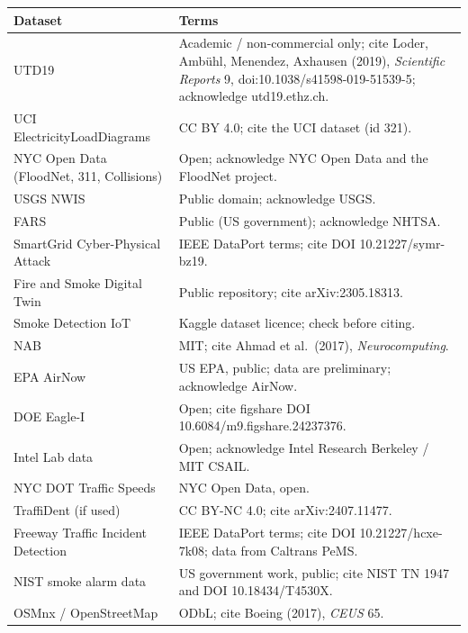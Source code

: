 \documentclass[10pt,a4paper]{article}
\begin{document}
{\small
{}
\begin{tabularx}{\textwidth}{@{}L{4.5cm}Y@{}}
\toprule
\textbf{Dataset} & \textbf{Terms}\\
\midrule
UTD19 & Academic / non-commercial only; cite Loder, Ambühl, Menendez, Axhausen (2019), \textit{Scientific Reports} 9, doi:10.1038/s41598-019-51539-5; acknowledge utd19.ethz.ch.\\
UCI ElectricityLoadDiagrams & CC BY 4.0; cite the UCI dataset (id 321).\\
NYC Open Data (FloodNet, 311, Collisions) & Open; acknowledge NYC Open Data and the FloodNet project.\\
USGS NWIS & Public domain; acknowledge USGS.\\
FARS & Public (US government); acknowledge NHTSA.\\
SmartGrid Cyber-Physical Attack & IEEE DataPort terms; cite DOI 10.21227/symr-bz19.\\
Fire and Smoke Digital Twin & Public repository; cite arXiv:2305.18313.\\
Smoke Detection IoT & Kaggle dataset licence; check before citing.\\
NAB & MIT; cite Ahmad et al.\ (2017), \textit{Neurocomputing}.\\
EPA AirNow & US EPA, public; data are preliminary; acknowledge AirNow.\\
DOE Eagle-I & Open; cite figshare DOI 10.6084/m9.figshare.24237376.\\
Intel Lab data & Open; acknowledge Intel Research Berkeley / MIT CSAIL.\\
NYC DOT Traffic Speeds & NYC Open Data, open.\\
TraffiDent (if used) & CC BY-NC 4.0; cite arXiv:2407.11477.\\
Freeway Traffic Incident Detection & IEEE DataPort terms; cite DOI 10.21227/hcxe-7k08; data from Caltrans PeMS.\\
NIST smoke alarm data & US government work, public; cite NIST TN 1947 and DOI 10.18434/T4530X.\\
OSMnx / OpenStreetMap & ODbL; cite Boeing (2017), \textit{CEUS} 65.\\
\bottomrule
\end{tabularx}
}
\end{document}
